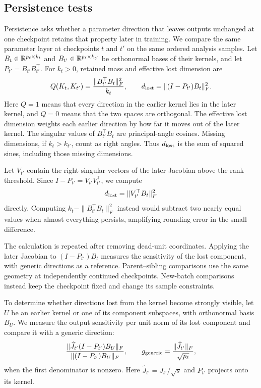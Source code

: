\subsection{Persistence tests}
\label{app:methods-persistence}
Persistence asks whether a parameter direction that leaves outputs unchanged at one checkpoint retains that property later in training. We compare the same parameter layer at checkpoints $t$ and $t'$ on the same ordered analysis samples. Let $B_t\in\mathbb R^{p_\ell\times k_t}$ and $B_{t'}\in\mathbb R^{p_\ell\times k_{t'}}$ be orthonormal bases of their kernels, and let $P_{t'}=B_{t'}B_{t'}^\top$. For $k_t>0$, retained mass and effective lost dimension are
\[
 Q(K_t,K_{t'})=\frac{\|B_{t'}^\top B_t\|_F^2}{k_t},\qquad
 d_{\rm lost}=\|(I-P_{t'})B_t\|_F^2.
\]
Here $Q=1$ means that every direction in the earlier kernel lies in the later kernel, and $Q=0$ means that the two spaces are orthogonal. The effective lost dimension weights each earlier direction by how far it moves out of the later kernel. The singular values of $B_{t'}^\top B_t$ are principal-angle cosines. Missing dimensions, if $k_t>k_{t'}$, count as right angles. Thus $d_{\rm lost}$ is the sum of squared sines, including those missing dimensions.

Let $V_{t'}$ contain the right singular vectors of the later Jacobian above the rank threshold. Since $I-P_{t'}=V_{t'}V_{t'}^\top$, we compute
\[
 d_{\rm lost}=\|V_{t'}^\top B_t\|_F^2
\]
directly. Computing $k_t-\|B_{t'}^\top B_t\|_F^2$ instead would subtract two nearly equal values when almost everything persists, amplifying rounding error in the small difference.

The calculation is repeated after removing dead-unit coordinates. Applying the later Jacobian to $(I-P_{t'})B_t$ measures the sensitivity of the lost component, with generic directions as a reference. Parent--sibling comparisons use the same geometry at independently continued checkpoints. New-batch comparisons instead keep the checkpoint fixed and change its sample constraints.

To determine whether directions lost from the kernel become strongly visible, let $U$ be an earlier kernel or one of its component subspaces, with orthonormal basis $B_U$. We measure the output sensitivity per unit norm of its lost component and compare it with a generic direction:
\[
 \frac{\|\widehat J_{t'}(I-P_{t'})B_U\|_F}
      {\|(I-P_{t'})B_U\|_F},\qquad
 g_{\rm generic}=\frac{\|\widehat J_{t'}\|_F}{\sqrt{p_\ell}},
\]
when the first denominator is nonzero. Here $\widehat J_{t'}=J_{t'}/\sqrt{s}$ and $P_{t'}$ projects onto its kernel.

